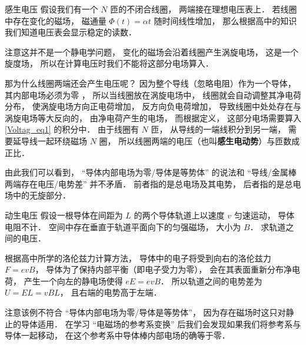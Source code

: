 \begin{example}{感生电压}
假设我们有一个 $N$ 匝的不闭合线圈， 两端接在理想电压表上． 若线圈中存在变化的磁场， 磁通量 $\Phi(t) = \alpha t$ 随时间线性增加， 那么根据高中的知识我们知道电压表会显示稳定的读数．

注意这并不是一个静电学问题， 变化的磁场会沿着线圈产生涡旋电场， 这是一个旋度场， 所以在计算电压时我们不能将这部分电场算入．

那为什么线圈两端还会产生电压呢？ 因为整个导线（忽略电阻）作为一个导体， 其内部电场必须为零%
， 所以当线圈放在涡旋电场中， 线圈就会自动调整其净电荷分布， 使涡旋电场方向正电荷增加， 反方向负电荷增加， 导致线圈中处处存在与涡旋电场等大反向的， 由净电荷产生的电场， 而根据定义， 这部分电场需要算入\autoref{Voltag_eq1} 的积分中． 由于线圈有 $N$ 匝， 从导线的一端线积分到另一端， 需要延导线一起环绕磁场 $N$ 圈， 所以线圈两端的电压（也叫\textbf{感生电动势}）与匝数成正比．
\end{example}

由此我们可以看到， “导体内部电场为零/导体是等势体” 的说法和 “导线/金属棒两端存在电压/电势差” 并不矛盾． 前者指的是总电场及其电势， 后者指的是总电场中的无旋部分．

\begin{example}{动生电压}
假设一根导体在间距为 $L$ 的两个导体轨道上以速度 $v$ 匀速运动， 导体电阻不计． 空间中存在垂直于轨道平面向下的匀强磁场， 大小为 $B$． 求轨道之间的电压．

根据高中所学的洛伦兹力计算方法， 导体中的电子将受到向右的洛伦兹力 $F = evB$， 导体为了保持内部平衡（即电子受力为零）， 会在其表面重新分布净电荷， 产生一个向左的静电场使得 $eE = evB$． 所以轨道之间的电势差为 $U = EL = vBL$， 且右端的电势高于左端．
\end{example}

注意该例不符合 “导体内部电场为零/导体是等势体”， 因为存在磁场时这只对静止的导体适用． 在学习 “电磁场的参考系变换” 后我们会发现如果我们将参考系与导体一起移动， 在这个参考系中导体棒内部电场的确等于零．

